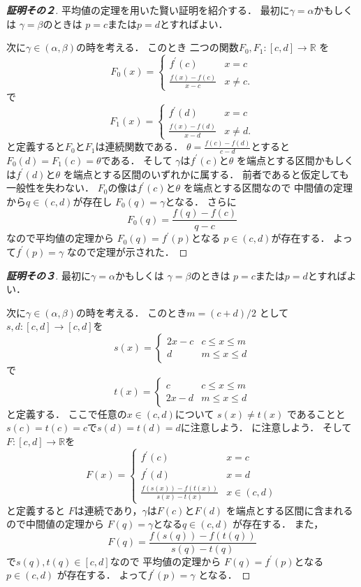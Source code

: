 \documentclass[leqno, a4paper, 12pt]{jsarticle}
\newcommand{\rr}{\mathbb{R}}
\newcommand{\bibun}[1]{#1^{\prime}}
\begin{document}
\begin{proof}[\textbf{証明その２}]
平均値の定理を用いた賢い証明を紹介する．
最初に$\gamma=\alpha$かもしくは
$\gamma=\beta$のときは
$p=c$または$p=d$とすればよい．

次に$\gamma\in (\alpha, \beta)$の時を考える．
このとき
二つの関数$F_{0}, F_{1}: [c, d]\to \rr$
を
\[
F_{0}(x)=
\begin{cases}
\bibun{f}(c) & \text{$x=c$}\\
\displaystyle \frac{f(x)-f(c)}{x-c} & \text{$x\neq c$.}
\end{cases}
\]
で
\[
F_{1}(x)=
\begin{cases}
\bibun{f}(d) & \text{$x=c$}\\
\displaystyle \frac{f(x)-f(d)}{x-d} & \text{$x\neq d$.}
\end{cases}
\]
と定義すると$F_{0}$と$F_{1}$は連続関数である．
$\theta=\frac{f(c)-f(d)}{c-d}$とすると
$F_{0}(d)=F_{1}(c)=\theta$である．
そして
$\gamma$は$\bibun{f}(c)$と$\theta$
を端点とする区間かもしくは$\bibun{f}(d)$と$\theta$
を端点とする区間のいずれかに属する．
前者であると仮定しても一般性を失わない．
$F_{0}$の像は$\bibun{f}(c)$と$\theta$
を端点とする区間なので
中間値の定理から$q\in (c, d)$が存在し
$F_{0}(q)=\gamma$となる．
さらに
\[
F_{0}(q)=\frac{f(q)-f(c)}{q-c}
\]
なので平均値の定理から
$F_{0}(q)=\bibun{f}(p)$となる
$p\in (c, d)$が存在する．
よって$\bibun{f}(p)=\gamma$
なので定理が示された．
\end{proof}
\begin{proof}[\textbf{証明その３}]
最初に$\gamma=\alpha$かもしくは
$\gamma=\beta$のときは
$p=c$または$p=d$とすればよい．

次に$\gamma\in (\alpha, \beta)$の時を考える．
このとき$m=(c+d)/2$
として$s, d: [c, d]\to [c, d]$を
\[
s(x)=
\begin{cases}
2x-c & \textit{$c\le x\le m$}\\
d & \textit{$m\le x\le d$}
\end{cases}
\]
で
\[
t(x)=
\begin{cases}
c & \textit{$c\le x\le m$}\\
2x-d & \textit{$m\le x\le d$}
\end{cases}
\]
と定義する．
ここで任意の$x\in (c, d)$について
$s(x)\neq t(x)$
であることと
$s(c)=t(c)=c$で$s(d)=t(d)=d$に注意しよう．
に注意しよう．
そして$F: [c, d]\to \rr$を
\[
F(x)=
\begin{cases}
\bibun{f}(c) &\text{$x=c$}\\
\bibun{f}(d) & \text{$x=d$}\\
\displaystyle \frac{f(s(x))-f(t(x))}{s(x)-t(x)} & \text{$x\in (c, d)$}
\end{cases}
\]
と定義すると
$F$は連続であり，$\gamma$は$F(c)$と$F(d)$
を端点とする区間に含まれるので中間値の定理から
$F(q)=\gamma$となる$q\in (c, d)$
が存在する．
また，
\[
F(q)=\frac{f(s(q))-f(t(q))}{s(q)-t(q)} 
\]
で$s(q), t(q)\in [c, d]$なので
平均値の定理から
$F(q)=\bibun{f}(p)$となる$p\in (c, d)$
が存在する．
よって$\bibun{f}(p)=\gamma$
となる．
\end{proof}
\end{document}
